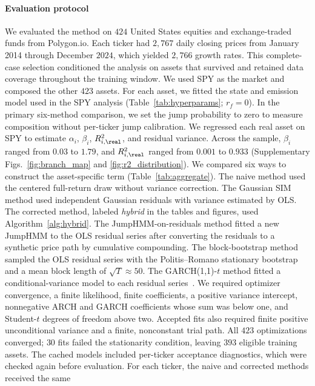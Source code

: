 \paragraph{Evaluation protocol}

We evaluated the method on $424$ United States equities and exchange-traded funds
from Polygon.io. Each ticker had $2{,}767$ daily closing prices from
January 2014 through December $2024$, which yielded $2{,}766$ growth
rates. This complete-case selection conditioned the analysis on assets
that survived and retained data coverage throughout the training
window. We used SPY as the market and composed the other $423$ assets.
For each asset, we fitted the state and emission model used in the SPY
analysis (Table~\ref{tab:hyperparams}; $r_f=0$). In the primary
six-method comparison, we set the jump probability to zero to measure
composition without per-ticker jump calibration. We regressed each
real asset on SPY to estimate $\alpha_i$, $\beta_i$, $R^2_{i,\real}$,
and residual variance. Across the sample, $\beta_i$ ranged from $0.03$
to $1.79$, and $R^2_{i,\real}$ ranged from $0.001$ to $0.933$
(Supplementary Figs.~\ref{fig:branch_map} and \ref{fig:r2_distribution}).
We compared six ways to construct the asset-specific term
(Table~\ref{tab:aggregate}). The naive
method used the centered full-return draw without variance correction. The Gaussian
SIM method used independent Gaussian residuals with variance estimated
by OLS. The corrected method, labeled \emph{hybrid} in the tables and
figures, used Algorithm~\ref{alg:hybrid}. The
JumpHMM-on-residuals method fitted a new JumpHMM to the OLS residual
series after converting the residuals to a synthetic price path by
cumulative compounding. The block-bootstrap method sampled the OLS
residual series with the Politis--Romano stationary
bootstrap~\cite{politisRomano1994} and a mean block length of
$\sqrt{T}\approx 50$. The GARCH(1,1)-$t$ method fitted a
conditional-variance model to each residual series~\cite{bollerslev1986}.
We required optimizer convergence, a finite likelihood, finite
coefficients, a positive variance intercept, nonnegative ARCH and
GARCH coefficients whose sum was below one, and Student-$t$ degrees
of freedom above two. Accepted fits also required finite positive
unconditional variance and a finite, nonconstant trial path. All $423$
optimizations converged; $30$ fits failed the stationarity condition,
leaving $393$ eligible training assets. The cached models included
per-ticker acceptance diagnostics, which were checked again before
evaluation.
For each ticker, the naive and corrected methods received the same
